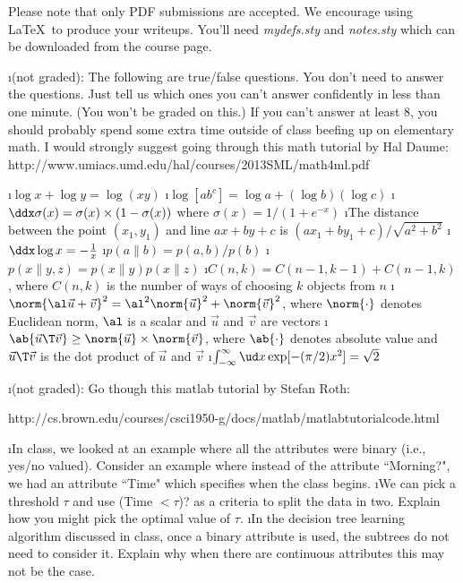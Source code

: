 \documentclass[fleqn]{article}
\begin{document}


Please note that only PDF submissions are accepted.  We encourage using \LaTeX\ to produce your writeups. You'll need {\em mydefs.sty} and {\em notes.sty} which can be downloaded from the course page.

\bee
\i (not graded): The following are true/false questions.  You don't need to answer the
questions.  Just tell us which ones you can't answer confidently in
less than one minute.  (You won't be graded on this.)  If you can't
answer at least $8$, you should probably spend some extra time outside
of class beefing up on elementary math. I would strongly suggest going through this math tutorial by Hal Daume: http://www.umiacs.umd.edu/\texttildelow hal/courses/2013S\textunderscore ML/math4ml.pdf

\bee
\i $\log x + \log y = \log (xy)$
\i $\log [ab^c] = \log a + (\log b) (\log c)$
\i $\ddx \sigma(x) = \sigma(x)\times(1-\sigma(x))$ where $\sigma(x) = 1/(1+e^{-x})$
\i The distance between the point $(x_1,y_1)$ and line $ax + by + c$ is ${(ax_1 + by_1+c)}/{\sqrt{a^2 + b^2}}$
\i $\ddx \log x = - \frac 1 x$
\i $p(a \| b) = p(a,b) / p(b)$
\i $p(x \| y,z) = p(x \| y) p(x \| z)$
\i $C(n,k) = C(n-1, k-1) + C(n-1, k)$, where $C(n,k)$ is the number of ways of choosing $k$ objects from $n$
\i $\norm{\al \vec u + \vec v}^2 = \al^2 \norm{\vec u}^2 + \norm{\vec v}^2$, where $\norm{\cdot}$ denotes Euclidean norm, $\al$ is a scalar and $\vec u$ and $\vec v$ are vectors
\i $\ab{\vec u\T\vec v} \geq \norm{\vec u} \times \norm{\vec v}$, where $\ab{\cdot}$ denotes absolute value and $\vec u\T\vec v$ is the dot product of $\vec u$ and $\vec v$
\i $\int_{-\infty}^{\infty} \ud x \exp[-(\pi/2) x^2] = \sqrt{2}$
\ene

\i (not graded): Go though this matlab tutorial by Stefan Roth:

 http://cs.brown.edu/courses/csci1950-g/docs/matlab/matlabtutorialcode.html



\i In class, we looked at an example where all the attributes were binary (i.e., yes/no valued). Consider an example where instead of the attribute ``Morning?", we had an attribute ``Time" which specifies when the class begins. 
\bee
\i We can pick a threshold $\tau$ and use (Time $< \tau$)? as a criteria to split the data in two. Explain how you might pick the optimal value of $\tau$.
\i In the decision tree learning algorithm discussed in class, once a binary attribute is used, the subtrees do not need to consider it. Explain why when there are continuous attributes this may not be the case.
\ene
 
\end{document}
